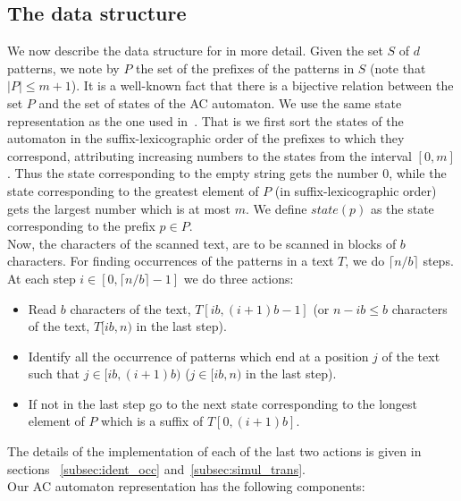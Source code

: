 \documentclass{article}
\newcommand{\?}{\mskip1.5mu}
\begin{document}
\subsection{The data structure}
We now describe the data structure for in more detail. Given the set $S$ of $d$ patterns, we note by $P$ the set of the prefixes of the patterns in $S$ (note that $|P|\leq m+1$). It is a well-known fact that there is a bijective relation between the set $P$ and the set of states of the AC automaton. We use the same state representation as the one used in~\cite{B10a}. That is we first sort the states of the automaton in the suffix-lexicographic order of the prefixes to which they correspond, attributing increasing numbers to the states from the interval $[0,m]$. Thus the state corresponding to the  empty string gets the number $0$, while the state corresponding to the greatest element of $P$ (in suffix-lexicographic order) gets the largest number which is at most $m$. 
We define $state(p)$ as the state corresponding to the prefix $p\in P$. 
\\ 
Now, the characters of the scanned text, are to be scanned in blocks of $b$ characters. 
For finding occurrences of the patterns in a text $T$, we do $\lceil n/b\rceil$ steps. At each step $i\in [0,\lceil n/b\rceil-1]$ we do three actions:
\begin{itemize}
\item Read $b$ characters of the text, $T[ib,(i+1)b-1]$ (or $n-ib\leq b$ characters of the text, $T[ib,n)$ in the last step).
\item Identify all the occurrence of patterns which end at a position $j$ of the text such that $j\in [ib,(i+1)b)$ ($j\in[ib,n)$ in the last step). 
\item If not in the last step go to the next state corresponding to the longest element of $P$ which is a suffix of $T[0,(i+1)b]$. 
\end{itemize}
The details of the implementation of each of the last two actions is given in sections ~\ref{subsec:ident_occ} and~\ref{subsec:simul_trans}. 
\\Our AC automaton representation has the following components:
\end{document}
